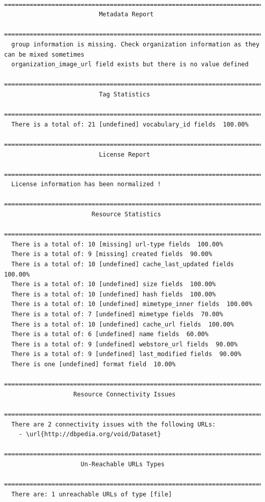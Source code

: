 \documentclass[runningheads,a4paper]{../../Util/LaTEX/llncs}
\begin{document}
\begin{lstlisting}
 =======================================================================
                          Metadata Report
 =======================================================================
  group information is missing. Check organization information as they can be mixed sometimes
  organization_image_url field exists but there is no value defined
 =======================================================================
                          Tag Statistics
 =======================================================================
  There is a total of: 21 [undefined] vocabulary_id fields  100.00%
 =======================================================================
                          License Report
 =======================================================================
  License information has been normalized !
 =======================================================================
                        Resource Statistics
 =======================================================================
  There is a total of: 10 [missing] url-type fields  100.00%
  There is a total of: 9 [missing] created fields  90.00%
  There is a total of: 10 [undefined] cache_last_updated fields  100.00%
  There is a total of: 10 [undefined] size fields  100.00%
  There is a total of: 10 [undefined] hash fields  100.00%
  There is a total of: 10 [undefined] mimetype_inner fields  100.00%
  There is a total of: 7 [undefined] mimetype fields  70.00%
  There is a total of: 10 [undefined] cache_url fields  100.00%
  There is a total of: 6 [undefined] name fields  60.00%
  There is a total of: 9 [undefined] webstore_url fields  90.00%
  There is a total of: 9 [undefined] last_modified fields  90.00%
  There is one [undefined] format field  10.00%
 =======================================================================
                   Resource Connectivity Issues
 =======================================================================
  There are 2 connectivity issues with the following URLs:
    - \url{http://dbpedia.org/void/Dataset}
 =======================================================================
                     Un-Reachable URLs Types
 =======================================================================
  There are: 1 unreachable URLs of type [file]
\end{lstlisting}
\end{document}
